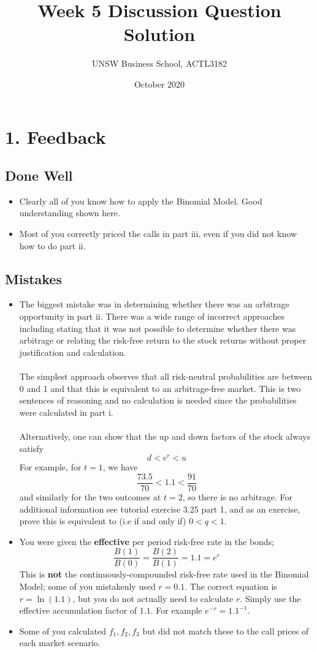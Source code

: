 \documentclass[11pt]{article}
\title{\textbf{Week 5 Discussion Question Solution}}
\author{UNSW Business School, ACTL3182}
\date{October 2020}
\begin{document}
	\maketitle
	
	\section*{1. Feedback}
		\subsection*{Done Well}
			\begin{itemize}
				\item Clearly all of you know how to apply the Binomial Model. Good understanding shown here.
				\item Most of you correctly priced the calls in part iii, even if you did not know how to do part ii.
			\end{itemize}
		\subsection*{Mistakes}
			\begin{itemize}
				\item The biggest mistake was in determining whether there was an arbitrage opportunity in part ii. There was a wide range of incorrect approaches including stating that it was not possible to determine whether there was arbitrage or relating the risk-free return to the stock returns without proper justification and calculation. \\\\
				The simplest approach observes that all risk-neutral probabilities are between 0 and 1 and that this is equivalent to an arbitrage-free market. This is two sentences of reasoning and no calculation is needed since the probabilities were calculated in part i. \\\\
				Alternatively, one can show that the up and down factors of the stock always satisfy
				$$d < e^{r} < u$$
				For example, for $t=1$, we have
				$$\frac{73.5}{70} < 1.1 < \frac{91}{70}$$
				and similarly for the two outcomes at $t=2$, so there is no arbitrage. For additional information see tutorial exercise 3.25 part 1, and as an exercise, prove this is equivalent to (i.e if and only if) $0<q<1$.
				\item You were given the \textbf{effective} per period risk-free rate in the bonds;
				\[	\frac{B(1)}{B(0)} = \frac{B(2)}{B(1)} = 1.1 = e^{r}
					\]
				This is \textbf{not} the continuously-compounded risk-free rate used in the Binomial Model; some of you mistakenly used $r=0.1$. The correct equation is $r = \ln(1.1)$, but you do not actually need to calculate $r$. Simply use the effective accumulation factor of $1.1$. For example $e^{-r} = 1.1^{-1}$.
				\item Some of you calculated $f_{1},f_{2},f_{3}$ but did not match these to the call prices of each market scenario.
			\end{itemize}
\end{document}
